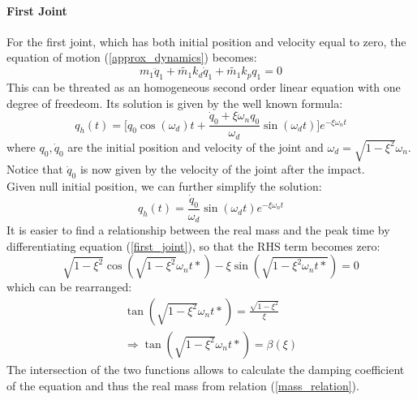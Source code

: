 \documentclass[a4paper,12pt,oneside]{report}
\begin{document}
\paragraph{First Joint}
For the first joint, which has both initial position and velocity equal to zero, the equation of motion (\ref{approx_dynamics}) becomes:
\begin{equation}
  m_1 \ddot{q}_1+\tilde{m_1}k_d\dot{q}_1+\tilde{m_1}k_p q_1=0
\end{equation}
This can be threated as an homogeneous second order linear equation with one degree of freedeom.
Its solution is given by the well known formula:
\begin{equation}
  q_h(t)=\Big[q_0\cos{(\omega_d)t}+\frac{\dot{q}_0+\xi\omega_n q_0}{\omega_d}\sin{(\omega_dt)}\Big]e^{-\xi \omega_n t}
\end{equation}
where $q_0,\dot{q}_0$ are the initial position and velocity of the joint and $\omega_d=\sqrt{1-\xi^2}\omega_n$. Notice that $\dot{q}_0$ is now given by the velocity of the joint after the impact.\\
Given null initial position, we can further simplify the solution:
\begin{equation}
  q_h(t)=\frac{\dot{q}_0}{\omega_d}\sin{(\omega_dt)}e^{-\xi \omega_n t}
  \label{first_joint}
\end{equation}
It is easier to find a relationship between the real mass and the peak time by differentiating equation (\ref{first_joint}), so that the RHS term becomes zero:
\begin{equation}
  \sqrt{1-\xi^2}\cos{(\sqrt{1-\xi^2}\omega_nt*)-\xi\sin{(\sqrt{1-\xi^2\omega_nt*})}}=0
  \label{time_solution}
\end{equation}
which can be rearranged:
\begin{equation}
  \begin{array}{l}
  \tan{(\sqrt{1-\xi^2}\omega_nt*)}=\frac{\sqrt{1-\xi^2}}{\xi}\\
  \Rightarrow \tan{(\sqrt{1-\xi^2}\omega_nt*)}=\beta(\xi)
\end{array}
\end{equation}
The intersection of the two functions allows to calculate the damping coefficient of the equation and thus the real mass from relation (\ref{mass_relation}).
\end{document}
